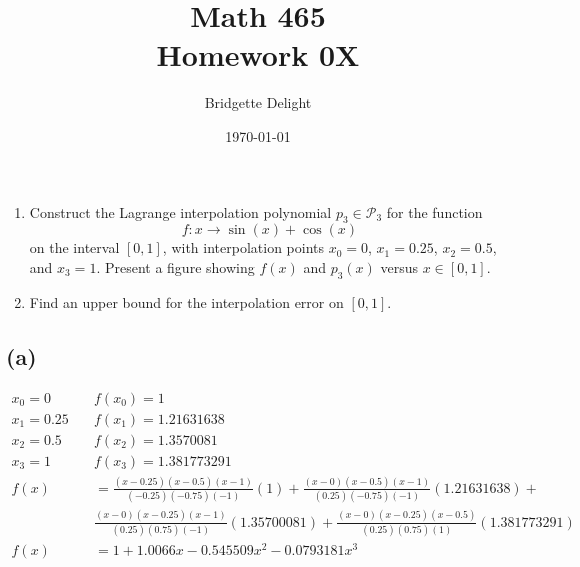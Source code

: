 \documentclass{article}
\title{{\large Math 465}\\ Homework 0X}
\author{Bridgette Delight}
\date{\today}
\begin{document}

\section{}
\begin{enumerate}[label = (\alph*)]
    \item  Construct the Lagrange interpolation polynomial $p_3 \in \mathcal{P}_3$ for the function
    \begin{equation*}
        f: x \to \sin(x) + \cos(x)
    \end{equation*}
    on the interval $[0, 1]$, with interpolation points $x_0 = 0$, $x_1 = 0.25$, $x_2 = 0.5$, and $x_3 = 1$. Present a figure showing $f(x)$ and $p_3(x)$ versus $x \in [0, 1]$.
    \item  Find an upper bound for the interpolation error on $[0, 1]$.
\end{enumerate}
\vspace{10mm}

\subsection*{(a)}

\begin{align*}
    x_0 = 0 \quad& f(x_0) = 1\\
    x_1 = 0.25 \quad& f(x_1) = 1.21631638\\
    x_2 = 0.5 \quad& f(x_2) = 1.3570081\\
    x_3 = 1 \quad& f(x_3) = 1.381773291\\
    f(x) &=  \frac{(x-0.25)(x-0.5)(x-1)}{(-0.25)(-0.75)(-1)}(1)
        +  \frac{(x-0)(x-0.5)(x-1)}{(0.25)(-0.75)(-1)}(1.21631638)+\\
        &  \frac{(x-0)(x-0.25)(x-1)}{(0.25)(0.75)(-1)}(1.35700081)
        +  \frac{(x-0)(x-0.25)(x-0.5)}{(0.25)(0.75)(1)}(1.381773291)\\
    f(x) &= 1 + 1.0066x - 0.545509 x^2 -0.0793181 x^3
\end{align*}
\end{document}
